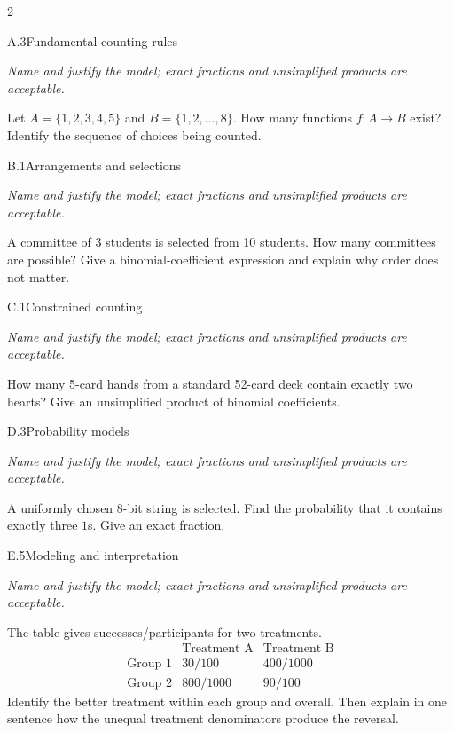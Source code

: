 \documentclass[9pt]{extarticle}
\begin{document}
\CoreWorkArea
\FormBreak
{}
\begin{multicols}{2}
\begin{CoreProblem}{A.3}{Fundamental counting rules}
{\scriptsize\textit{Name and justify the model; exact fractions and unsimplified products are acceptable.}\par}
Let $A=\{1,2,3,4,5\}$ and $B=\{1,2,\ldots,8\}$. How many functions
    $f:A\to B$ exist? Identify the sequence of choices being counted.
\end{CoreProblem}
\begin{CoreProblem}{B.1}{Arrangements and selections}
{\scriptsize\textit{Name and justify the model; exact fractions and unsimplified products are acceptable.}\par}
A committee of 3 students is selected from 10 students. How many
    committees are possible? Give a binomial-coefficient expression and explain
    why order does not matter.
\end{CoreProblem}
\begin{CoreProblem}{C.1}{Constrained counting}
{\scriptsize\textit{Name and justify the model; exact fractions and unsimplified products are acceptable.}\par}
How many 5-card hands from a standard 52-card deck contain exactly
    two hearts? Give an unsimplified product of binomial coefficients.
\end{CoreProblem}
\columnbreak
\begin{CoreProblem}{D.3}{Probability models}
{\scriptsize\textit{Name and justify the model; exact fractions and unsimplified products are acceptable.}\par}
A uniformly chosen 8-bit string is selected. Find the probability
    that it contains exactly three $1$s. Give an exact fraction.
\end{CoreProblem}
\begin{CoreProblem}{E.5}{Modeling and interpretation}
{\scriptsize\textit{Name and justify the model; exact fractions and unsimplified products are acceptable.}\par}
The table gives successes/participants for two treatments.
    \[
    \begin{array}{c|cc}
      &\text{Treatment A}&\text{Treatment B}\\\hline
      \text{Group 1}&30/100&400/1000\\
      \text{Group 2}&800/1000&90/100
    \end{array}
    \]
    Identify the better treatment within each group and overall. Then explain in
    one sentence how the unequal treatment denominators produce the reversal.
\end{CoreProblem}
\end{multicols}
\end{document}

